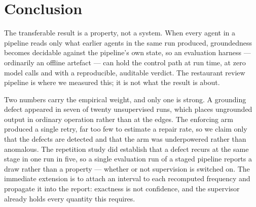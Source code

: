 \documentclass[runningheads]{llncs}
\begin{document}
\section{Conclusion}
\label{sec:conclusion}

The transferable result is a property, not a system. When every agent in a
pipeline reads only what earlier agents in the same run produced, groundedness
becomes decidable against the pipeline's own state, so an evaluation harness ---
ordinarily an offline artefact --- can hold the control path at run time, at zero
model calls and with a reproducible, auditable verdict. The restaurant review
pipeline is where we measured this; it is not what the result is about.

Two numbers carry the empirical weight, and only one is strong. A grounding defect
appeared in seven of twenty unsupervised runs, which places ungrounded output in
ordinary operation rather than at the edges. The enforcing arm produced a single
retry, far too few to estimate a repair rate, so we claim only that the defects
are detected and that the arm was underpowered rather than anomalous. The
repetition study did establish that a defect recurs at the same stage in one run
in five, so a single evaluation run of a staged pipeline reports a draw rather
than a property --- whether or not supervision is switched on. The immediate
extension is to attach an interval to each recomputed frequency and propagate it
into the report: exactness is not confidence, and the supervisor already holds
every quantity this requires.



\end{document}
